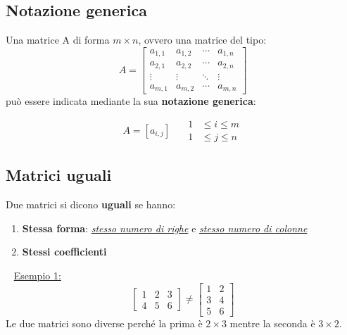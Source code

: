 \documentclass[11pt,oneside]{book}
\begin{document}
\subsection{Notazione generica}
Una matrice A di forma $m \times n$, ovvero una matrice del tipo:
\begin{equation*}
    A =
    \begin{bmatrix}
        a_{1,1} & a_{1,2} & \cdots & a_{1,n} \\
        a_{2,1} & a_{2,2} & \cdots & a_{2,n} \\
        \vdots  & \vdots  & \ddots & \vdots  \\
        a_{m,1} & a_{m,2} & \cdots & a_{m,n}
    \end{bmatrix}
\end{equation*}
può essere indicata mediante la sua \textbf{notazione generica}:

\begin{equation*}
    A = [a_{i,j}] \;\;\;\;\; \begin{aligned} 1&\le i\le m\\ 1&\le j\le n \end{aligned}
\end{equation*}

\subsection{Matrici uguali}
Due matrici si dicono \textbf{uguali} se hanno:
\begin{enumerate}
    \item \textbf{Stessa forma}: \emph{\underline{stesso numero di righe}} e \emph{\underline{stesso numero di colonne}}
    \item \textbf{Stessi coefficienti}
\end{enumerate}
~\newline
\underline{Esempio 1:}
\begin{equation*}
    \begin{bmatrix}
        1 & 2 & 3 \\
        4 & 5 & 6
    \end{bmatrix}
    \neq
    \begin{bmatrix}
        1 & 2 \\
        3 & 4 \\
        5 & 6
    \end{bmatrix}
\end{equation*}
Le due matrici sono diverse perché la prima è $2\times 3$ mentre la seconda è $3\times 2$.
\end{document}
